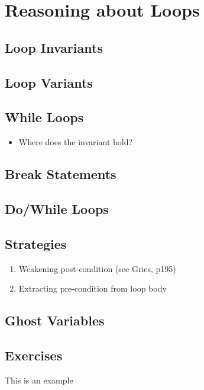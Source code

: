 \chapter{Reasoning about Loops}

\section{Loop Invariants}
\section{Loop Variants}
\section{While Loops}
\begin{itemize}
\item Where does the invariant hold?
\end{itemize}
\section{Break Statements}
\section{Do/While Loops}
\section{Strategies}
\begin{enumerate}
\item Weakening post-condition (see Gries, p195)
\item Extracting pre-condition from loop body
\end{enumerate}
\section{Ghost Variables}


\section{Exercises}

\begin{ex}
This is an example
\end{ex}